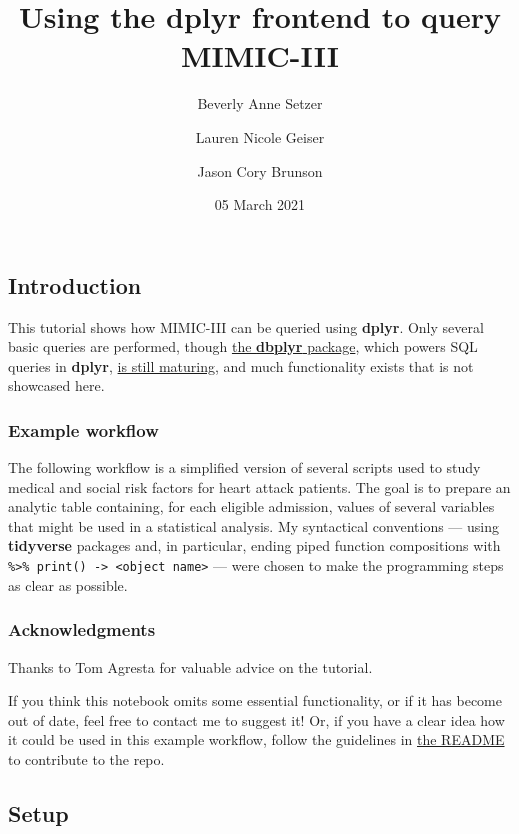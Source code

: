 \documentclass[
]{article}
\title{Using the \textbf{dplyr} frontend to query MIMIC-III}
\author{Beverly Anne Setzer \and Lauren Nicole Geiser \and Jason Cory
Brunson}
\date{05 March 2021}
\begin{document}
\maketitle

\hypertarget{introduction}{%
\subsection{Introduction}\label{introduction}}

This tutorial shows how MIMIC-III can be queried using \textbf{dplyr}.
Only several basic queries are performed, though
\href{https://dbplyr.tidyverse.org/}{the \textbf{dbplyr} package}, which
powers SQL queries in \textbf{dplyr},
\href{https://github.com/tidyverse/dbplyr/issues}{is still maturing},
and much functionality exists that is not showcased here.

\hypertarget{example-workflow}{%
\subsubsection{Example workflow}\label{example-workflow}}

The following workflow is a simplified version of several scripts used
to study medical and social risk factors for heart attack patients. The
goal is to prepare an analytic table containing, for each eligible
admission, values of several variables that might be used in a
statistical analysis. My syntactical conventions --- using
\textbf{tidyverse} packages and, in particular, ending piped function
compositions with
\texttt{\%\textgreater{}\%\ print()\ -\textgreater{}\ \textless{}object\ name\textgreater{}}
--- were chosen to make the programming steps as clear as possible.

\hypertarget{acknowledgments}{%
\subsubsection{Acknowledgments}\label{acknowledgments}}

Thanks to Tom Agresta for valuable advice on the tutorial.

If you think this notebook omits some essential functionality, or if it
has become out of date, feel free to contact me to suggest it! Or, if
you have a clear idea how it could be used in this example workflow,
follow the guidelines in
\href{https://github.com/MIT-LCP/mimic-code}{the README} to contribute
to the repo.

\hypertarget{setup}{%
\subsection{Setup}\label{setup}}
\end{document}
